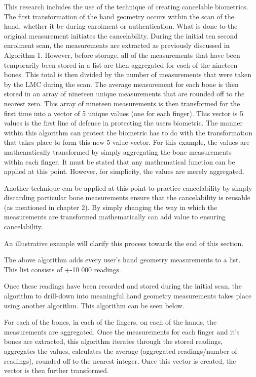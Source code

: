 This research includes the use of the technique of creating cancelable biometrics. The first transformation of the hand geometry occurs within the scan of the hand, whether it be during enrolment or authentication. What is done to the original measurement initiates the cancelability. During the initial ten second enrolment scan, the measurements are extracted as previously discussed in Algorithm 1. However, before storage, all of the measurements that have been temporarily been stored in a list are then aggregated for each of the nineteen bones. This total is then divided by the number of measurements that were taken by the LMC during the scan. The average measurement for each bone is then stored in an array of nineteen unique measurements that are rounded off to the nearest zero. This array of nineteen measurements is then transformed for the first time into a vector of 5 unique values (one for each finger). This vector is 5 values is the first line of defence in protecting the users biometric. The manner within this algorithm can protect the biometric has to do with the transformation that takes place to form this new 5 value vector. For this example, the values are mathematically transformed by simply aggregating the bone measurements within each finger. It must be stated that any mathematical function can be applied at this point. However, for simplicity, the values are merely aggregated. 

Another technique can be applied at this point to practice cancelability by simply discarding particular bone measurements ensure that the cancelability is reusable (as mentioned in chapter 2). By simply changing the way in which the measurements are transformed mathematically can add value to ensuring cancelability. 

An illustrative example will clarify this process towards the end of this section.


The above algorithm adds every user's hand geometry measurements to a list. This list consists of +-10 000 readings.

Once these readings have been recorded and stored during the initial scan, the algorithm to drill-down into meaningful hand geometry measurements takes place using another algorithm. This algorithm can be seen below.

For each of the bones, in each of the fingers, on each of the hands, the measurements are aggregated. Once the measurements for each finger and it's bones are extracted, this algorithm iterates through the stored readings, aggregates the values, calculates the average (aggregated readings/number of readings), rounded off to the nearest integer. Once this vector is created, the vector is then further transformed. 

